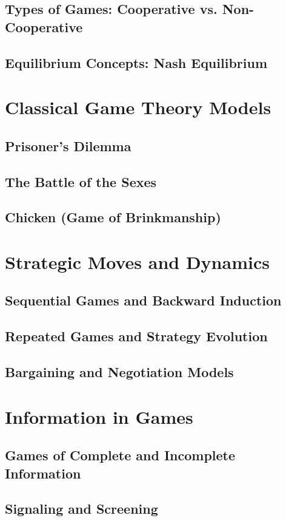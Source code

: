 \documentclass[12pt]{book} %
\begin{document}
\subsection{Types of Games: Cooperative vs. Non-Cooperative}
\subsection{Equilibrium Concepts: Nash Equilibrium}

\section{Classical Game Theory Models}
\subsection{Prisoner's Dilemma}
\subsection{The Battle of the Sexes}
\subsection{Chicken (Game of Brinkmanship)}

\section{Strategic Moves and Dynamics}
\subsection{Sequential Games and Backward Induction}
\subsection{Repeated Games and Strategy Evolution}
\subsection{Bargaining and Negotiation Models}

\section{Information in Games}
\subsection{Games of Complete and Incomplete Information}
\subsection{Signaling and Screening}
\end{document}
